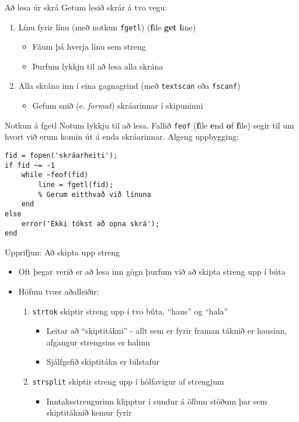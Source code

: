 \documentclass[handout]{beamer}
\begin{document}
\begin{frame}{Að lesa úr skrá}
Getum lesið skrár á tvo vegu:
\begin{enumerate}
 \item Línu fyrir línu (með notkun \texttt{fgetl}) (\textbf{f}ile \textbf{get} \textbf{l}ine)
 \begin{itemize}
  \item Fáum þá hverja línu sem streng
  \item Þurfum lykkju til að lesa alla skrána
 \end{itemize}
 \item Alla skrána inn í eina gagnagrind (með \texttt{textscan} eða \texttt{fscanf})
 \begin{itemize}
  \item Gefum snið (e. \emph{format}) skráarinnar í skipuninni
 \end{itemize}
\end{enumerate}
\end{frame}


\begin{frame}[fragile]{Notkun á fgetl}
\vspace{\baselineskip}
Notum lykkju til að lesa. Fallið \texttt{feof} (\textbf{f}ile \textbf{e}nd \textbf{o}f \textbf{f}ile) segir til um hvort við erum komin út á enda skráarinnar. Algeng uppbygging:
\begin{verbatim}
fid = fopen('skráarheiti');
if fid ~= -1
    while ~feof(fid)
        line = fgetl(fid);
        % Gerum eitthvað við línuna
    end
else
    error('Ekki tókst að opna skrá');
end
\end{verbatim}
\end{frame}

\begin{frame}[fragile]{Upprifjun: Að skipta upp streng}
\begin{itemize}
 \item Oft þegar verið er að lesa inn gögn þurfum við að skipta streng upp í búta
 \item Höfum tvær aðalleiðir: 
 \begin{enumerate}
  \item \texttt{strtok} skiptir streng upp í tvo búta, ``haus'' og ``hala''
  \begin{itemize}
   \item Leitar að ``skiptitákni'' - allt sem er fyrir framan táknið er hausinn, afgangur strengsins er halinn
   \item Sjálfgefið skiptitákn er bilstafur
  \end{itemize}
  \item \texttt{strsplit} skiptir streng upp í hólfavigur af strengjum
  \begin{itemize}
   \item Inntaksstrengurinn klipptur í sundur á öllum stöðum þar sem skiptitáknið kemur fyrir
  \end{itemize}
 \end{enumerate}
\end{itemize}
\end{frame}
\end{document}
